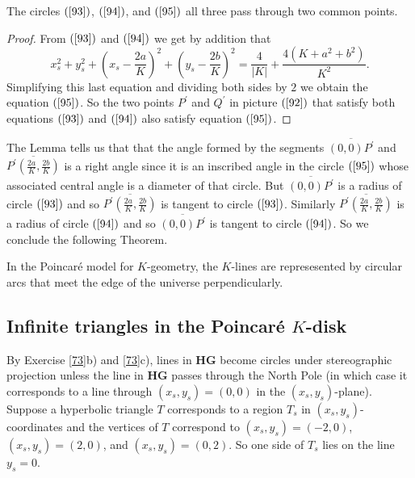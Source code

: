 \documentclass{ximera}
\begin{document}
\begin{lemma}
The circles $\left(  \ref{93}\right)  $, $\left(  \ref{94}\right)  $, and
$\left(  \ref{95}\right)  $ all three pass through two common points.
\end{lemma}

\begin{proof}
From $\left(  \ref{93}\right)  $ and $\left(  \ref{94}\right)  $ we get by
addition that%
\[
x_{s}^{2}+y_{s}^{2}+\left(  x_{s}-\frac{2a}{K}\right)  ^{2}+\left(
y_{s}-\frac{2b}{K}\right)  ^{2}=\frac{4}{\left\vert K\right\vert }%
+\frac{4\left(  K+a^{2}+b^{2}\right)  }{K^{2}}.
\]
Simplifying this last equation and dividing both sides by $2$ we obtain the
equation $\left(  \ref{95}\right)  $. So the two points $P^{\prime}$ and
$Q^{\prime}$ in picture $\left(  \ref{92}\right)  $ that satisfy both
equations $\left(  \ref{93}\right)  $ and $\left(  \ref{94}\right)  $ also
satisfy equation $\left(  \ref{95}\right)  $.
\end{proof}

The Lemma tells us that that the angle formed by the segments $\overline
{\left(  0,0\right)  P^{\prime}}$ and $\overline{P^{\prime}\left(  \frac
{2a}{K},\frac{2b}{K}\right)  }$ is a right angle since it is an inscribed
angle in the circle $\left(  \ref{95}\right)  $ whose associated central angle
is a diameter of that circle. But $\overline{\left(  0,0\right)  P^{\prime}}$
is a radius of circle $\left(  \ref{93}\right)  $ and so $\overline{P^{\prime
}\left(  \frac{2a}{K},\frac{2b}{K}\right)  }$ is tangent to circle $\left(
\ref{93}\right)  $. Similarly $\overline{P^{\prime}\left(  \frac{2a}{K}%
,\frac{2b}{K}\right)  }$ is a radius of circle $\left(  \ref{94}\right)  $ and
so $\overline{\left(  0,0\right)  P^{\prime}}$ is tangent to circle $\left(
\ref{94}\right)  $. So we conclude the following Theorem.

\begin{theorem}
 In the Poincar\'{e} model for $K$-geometry, the $K$-lines are
represesented by circular arcs that meet the edge of the universe
perpendicularly.
\end{theorem}

\subsection*{Infinite triangles in the Poincar\'{e} $K$-disk}

By Exercise \ref{73}b) and \ref{73}c), lines in \textbf{HG} become circles
under stereographic projection unless the line in \textbf{HG} passes through
the North Pole (in which case it corresponds to a line through $\left(
x_{s},y_{s}\right)  =\left(  0,0\right)  $ in the $\left(  x_{s},y_{s}\right)
$-plane). Suppose a hyperbolic triangle $T$ corresponds to a region $T_{s}$ in
$\left(  x_{s},y_{s}\right)  $-coordinates and the vertices of $T$ correspond
to $\left(  x_{s},y_{s}\right)  =\left(  -2,0\right)  $, $\left(  x_{s}%
,y_{s}\right)  =\left(  2,0\right)  $, and $\left(  x_{s},y_{s}\right)
=\left(  0,2\right)  $. So one side of $T_{s}$ lies on the line $y_{s}=0$.
\end{document}
